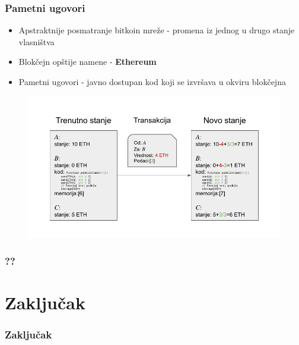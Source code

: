 \documentclass{beamer}
\begin{document}
\begin{frame}[fragile]\frametitle{Pametni ugovori}
	\begin{itemize}
		\item Apstraktnije posmatranje bitkoin mreže - promena iz jednog u drugo stanje vlasništva
		\item Blokčejn opštije namene - \textbf{Ethereum}
		\item Pametni ugovori - javno dostupan kod koji se izvršava u okviru blokčejna
	\end{itemize}

	\begin{figure}[H]
		\includegraphics[scale=0.55]{Ethereum_State_Transition.pdf}
	\end{figure}
\end{frame}

\begin{frame}[fragile]\frametitle{??}
	
\end{frame}


\section{Zaključak}

\begin{frame}[fragile]\frametitle{Zaključak}
	
\end{frame}
\end{document}
